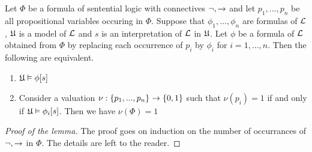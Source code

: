 \begin{lemma}\label{lemma:classical_sentential_logic_holds_in_models}
Let $\Phi$ be a formula of sentential logic with connectives $\neg, \rightarrow$ and let $p_1,...,p_n$ be all propositional variables occuring in $\Phi$. Suppose that $\phi_1,...,\phi_n$ are formulas of ${\mathcal L}$, ${\mathfrak U}$ is a model of ${\mathcal L}$ and $s$ is an interpretation of ${\mathcal L}$ in ${\mathfrak U}$. Let $\phi$ be a formula of ${\mathcal L}$ obtained from $\Phi$ by replacing each occurrence of $p_i$ by $\phi_i$ for $i = 1, ..., n$. Then the following are equivalent.
\begin{enumerate}[label=\textbf{\emph{(\roman*)}}, leftmargin=3.0em]
\item ${\mathfrak U} \vDash \phi[s]$
\item Consider a valuation $\nu:\{p_1,...,p_n\} \rightarrow \{0, 1\}$ such that $\nu(p_i) = 1$ if and only if ${\mathfrak U} \vDash \phi_i[s]$. Then we have $\nu(\Phi) = 1$
\end{enumerate}
\end{lemma}
\begin{proof}[Proof of the lemma]
The proof goes on induction on the number of occurrances of $\neg, \rightarrow$ in $\Phi$. The details are left to the reader.
\end{proof}

